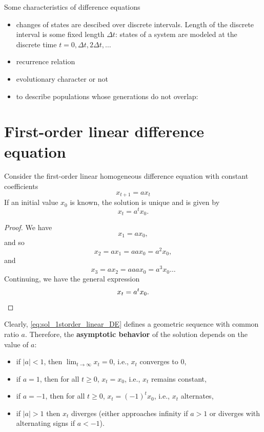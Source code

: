 Some characteristics of difference equations
\begin{itemize}
\item changes of states are descibed over discrete intervals. Length of the discrete interval is some fixed length $\Delta t$: states of a system are modeled at the discrete time $t=0,\Delta t, 2\Delta t, \dots$
\item recurrence relation
\item evolutionary character or not
\item to describe populations whose generations do not overlap:
\end{itemize}




\section{First-order linear difference equation}
\begin{proposition}
Consider the first-order linear homogeneous difference equation with constant coefficients
\begin{equation}\label{eq:1st_order_linearDE}
x_{t+1}=ax_t
\end{equation}
If an initial value $x_0$ is known, the solution is unique and is given by 
\begin{equation}\label{eq:sol_1storder_linear_DE}
x_t=a^tx_0.
\end{equation}
\end{proposition}

\begin{proof}
We have
\[
x_1=ax_0,
\]
and so
$$x_2=ax_1=aax_0=a^2 x_0,$$
and
$$x_3=ax_2=aaax_0=a^3x_0 \dots$$
Continuing, we have the general expression
\[
x_t=a^tx_0.\qedhere
\]
\end{proof}

Clearly, \eqref{eq:sol_1storder_linear_DE} defines a geometric sequence with common ratio $a$. Therefore, the \textbf{asymptotic behavior} of the solution depends on the value of $a$:
\begin{itemize}
\item if $|a|<1$, then $\lim_{t\rightarrow \infty}x_t=0$, i.e., $x_t$ converges to 0,
\item if $a=1$, then for all $t\geq 0$, $x_t=x_0$, i.e., $x_t$ remains constant,
\item if $a=-1$, then for all $t\geq 0$, $x_t=(-1)^tx_0$, i.e., $x_t$ alternates,
\item if $|a|>1$ then $x_t$ diverges (either approaches infinity if $a>1$ or diverges with alternating signs if $a<-1$).
\end{itemize}


